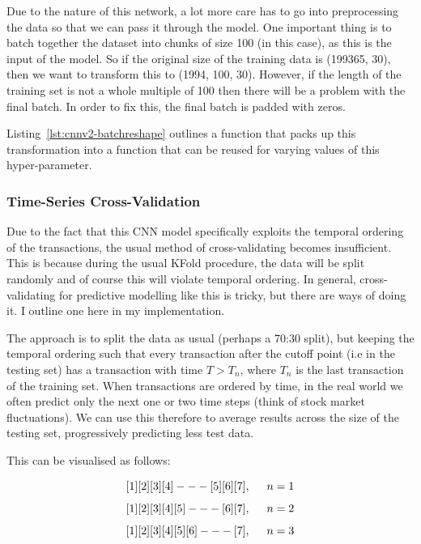 \documentclass[12pt,a4paper,twoside]{report}
\begin{document}
Due to the nature of this network, a lot more care has to go into preprocessing the data so that we can pass it through the model. One important thing is to batch together the dataset into chunks of size 100 (in this case), as this is the input of the model. So if the original size of the training data is (199365, 30), then we want to transform this to (1994, 100, 30). However, if the length of the training set is not a whole multiple of 100 then there will be a problem with the final batch. In order to fix this, the final batch is padded with zeros. 

Listing~\ref{lst:cnnv2-batchreshape} outlines a function that packs up this transformation into a function that can be reused for varying values of this hyper-parameter.



\subsubsection{Time-Series Cross-Validation}

Due to the fact that this CNN model specifically exploits the temporal ordering of the transactions, the usual method of cross-validating becomes insufficient. This is because during the usual KFold procedure, the data will be split randomly and of course this will violate temporal ordering. In general, cross-validating for predictive modelling like this is tricky, but there are ways of doing it. I outline one here in my implementation. 

The approach is to split the data as usual (perhaps a 70:30 split), but keeping the temporal ordering such that every transaction after the cutoff point (i.e in the testing set) has a transaction with time $T > T_{n} $, where $T_{n}$ is the last transaction of the training set. When transactions are ordered by time, in the real world we often predict only the next one or two time steps (think of stock market fluctuations). We can use this therefore to average results across the size of the testing set, progressively predicting less test data. 

This can be visualised as follows:

$$ [1] [2] [3] [4]  --- [5] [6] [7] , \hspace{5mm}  n=1$$
$$ [1] [2] [3] [4] [5] --- [6] [7] ,\hspace{5mm}  n=2$$
$$ [1] [2] [3] [4] [5] [6] --- [7] ,\hspace{5mm}  n=3$$
\end{document}
